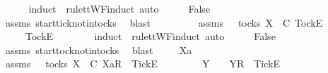 \begin{isabellebody}
\ \ \ \ \isamarkupfalse%
\ {\isacharparenleft}induct\ {\isasymrho}\ rule{\isacharcolon}ttWF{\isachardot}induct{\isacharcomma}\ auto{\isacharparenright}\isanewline
\ \ \isamarkupfalse%
\ \isamarkupfalse%
\ False\isanewline
\ \ \ \ \isamarkupfalse%
\ assms{\isacharparenleft}{}{\isacharparenright}\ start{\isacharunderscore}tick{\isacharunderscore}notin{\isacharunderscore}tocks\ \isamarkupfalse%
\ blast\isanewline
{}\isamarkupfalse%
\isanewline
\ \ \isamarkupfalse%
\ {\isasymrho}\ {\isasymsigma}\isanewline
\ \ \isamarkupfalse%
\ assms{\isacharcolon}\ {\isachardoublequoteopen}{\isasymrho}\ {\isasymin}\ tocks\ X{\isachardoublequoteclose}\ {\isachardoublequoteopen}{\isasymrho}\ {\isasymsubseteq}\isactrlsub C\ {\isacharbrackleft}Tock{\isacharbrackright}\isactrlsub E\ {\isacharhash}\ {\isasymsigma}{\isachardoublequoteclose}\isanewline
\ \ \isamarkupfalse%
\ \isamarkupfalse%
\ {\isasymrho}{\isacharprime}\ \ {\isachardoublequoteopen}{\isasymrho}\ {\isacharequal}\ {\isacharbrackleft}Tock{\isacharbrackright}\isactrlsub E\ {\isacharhash}\ {\isasymrho}{\isacharprime}{\isachardoublequoteclose}\isanewline
\ \ \ \ \isamarkupfalse%
\ {\isacharparenleft}induct\ {\isasymrho}\ rule{\isacharcolon}ttWF{\isachardot}induct{\isacharcomma}\ auto{\isacharparenright}\isanewline
\ \ \isamarkupfalse%
\ \isamarkupfalse%
\ False\isanewline
\ \ \ \ \isamarkupfalse%
\ assms{\isacharparenleft}{}{\isacharparenright}\ start{\isacharunderscore}tock{\isacharunderscore}notin{\isacharunderscore}tocks\ \isamarkupfalse%
\ blast\isanewline
{}\isamarkupfalse%
\isanewline
\ \ \isamarkupfalse%
\ {\isasymrho}\ Xa\ {\isasymsigma}\isanewline
\ \ \isamarkupfalse%
\ assms{\isacharcolon}\ {\isachardoublequoteopen}{\isasymrho}\ {\isasymin}\ tocks\ X{\isachardoublequoteclose}\ {\isachardoublequoteopen}{\isasymrho}\ {\isasymsubseteq}\isactrlsub C\ {\isacharbrackleft}Xa{\isacharbrackright}\isactrlsub R\ {\isacharhash}\ {\isacharbrackleft}Tick{\isacharbrackright}\isactrlsub E\ {\isacharhash}\ {\isasymsigma}{\isachardoublequoteclose}\isanewline
\ \ \isamarkupfalse%
\ \isamarkupfalse%
\ {\isasymrho}{\isacharprime}\ Y\ \ {\isachardoublequoteopen}{\isasymrho}\ {\isacharequal}\ {\isacharbrackleft}Y{\isacharbrackright}\isactrlsub R\ {\isacharhash}\ {\isacharbrackleft}Tick{\isacharbrackright}\isactrlsub E\ {\isacharhash}\ {\isasymrho}{\isacharprime}{\isachardoublequoteclose}\isanewline

\end{isabellebody}
